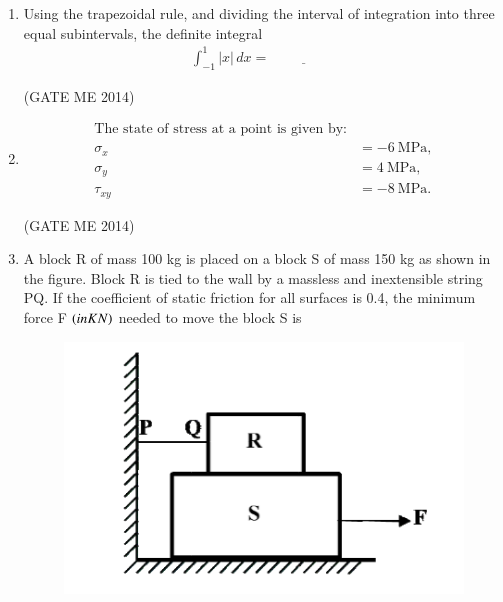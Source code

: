 \documentclass[journal]{IEEEtran}
\numberwithin{equation}{enumi}
\numberwithin{figure}{enumi}
\begin{document}
\begin{enumerate}
 \hfill{(GATE ME 2014)}
 
    \begin{multicols}{2}
    \begin{enumerate}
    
        \item $0.18$
        \item $0.36$
        \item $0.54$
        \item $0.6$
    \end{enumerate}
    \end{multicols}

    \item Using the trapezoidal rule, and dividing the interval of integration into three equal subintervals, the definite integral
\begin{align*} 
    \int_{-1}^{1} |x|\, dx = \underline{\hspace{2cm}}   
\end{align*} 

\hfill{(GATE ME 2014)}

\item \begin{align*}
\text{The state of stress at a point is given by:} \\
\sigma_x &= -6~\text{MPa}, \\
\sigma_y &= 4~\text{MPa}, \\
\tau_{xy} &= -8~\text{MPa}.
\end{align*}

\noindent
{}


 \hfill{(GATE ME 2014)}


\item A block R of mass 100 kg is placed on a block S of mass 150 kg as shown in the figure. Block R is tied to the wall by a massless and inextensible string PQ. If the coefficient of static friction for all surfaces is 0.4, the minimum force F $\left(in KN\right)$ needed to move the block S is

\begin{figure}[H]
    \centering
    \includegraphics[width = 0.6\columnwidth]{figs/fig2.4.png}
    \caption*{}
    \label{fig:Q31}
\end{figure}


\end{enumerate}
\end{document}
